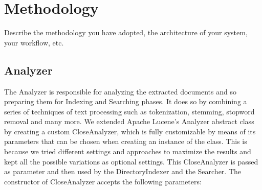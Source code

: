 \section{Methodology}
\label{sec:methodology}

Describe the methodology you have adopted, the architecture of your system, your workflow, etc.





\subsection{Analyzer}
The Analyzer is responsible for analyzing the extracted documents and so preparing them for Indexing and Searching phases. It does so by combining a series of techniques of text processing such as tokenization, stemming, stopword removal and many more.
\newline
We extended Apache Lucene's Analyzer abstract class by creating a custom CloseAnalyzer, which is fully customizable by means of its parameters that can be chosen when creating an instance of the class. This is because we tried different settings and approaches to maximize the results and kept all the possible variations as optional settings.
This CloseAnalyzer is passed as parameter and then used by the DirectoryIndexer and the Searcher.
\newline
The constructor of CloseAnalyzer accepts the following parameters:
